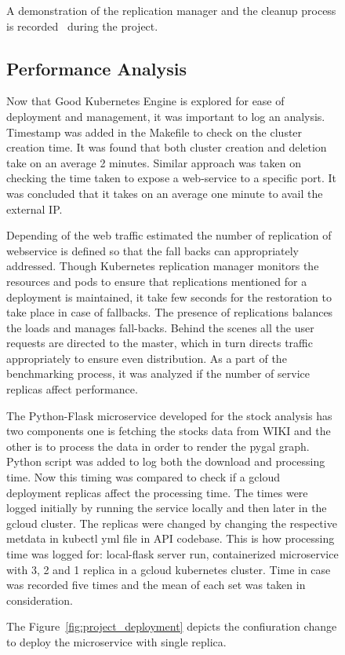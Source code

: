 \begin{figure}[htb]
A demonstration of the replication manager and the cleanup process is
  recorded~\cite{hid-sp18-417-google_cleanup} during the project.

\subsection{Performance Analysis}

Now that Good Kubernetes Engine is explored for ease of deployment and
management, it was important to log an analysis. Timestamp was added in the
Makefile to check on the cluster creation time. It was found that both cluster
creation and deletion take on an average 2 minutes. Similar approach was taken
on checking the time taken to expose a web-service to a specific port. It was
concluded that it takes on an average one minute to avail the external IP. 

Depending of the web traffic estimated the number of replication of webservice
is defined so that the fall backs can appropriately addressed. Though
Kubernetes replication manager monitors the resources and pods to ensure that
replications mentioned for a deployment is maintained, it take few seconds for
the restoration to take place in case of fallbacks. The presence of
replications balances the loads and manages fall-backs. Behind the scenes all
the user requests are directed to the master, which in turn directs traffic
appropriately to ensure even distribution. As a part of the benchmarking
process, it was analyzed if the number of service replicas affect performance.


The Python-Flask microservice developed for the stock analysis has two
components one is fetching the stocks data from WIKI and the other is to
process the data in order to render the pygal graph. Python script was added
to log both the download and processing time. Now this timing was compared to
check if a gcloud deployment replicas affect the processing time. The times
were logged initially by running the service locally and then later in the
gcloud cluster. The replicas were changed by changing the respective metdata
in kubectl yml file in API codebase. This is how processing time was logged
for: local-flask server run, containerized microservice with 3, 2 and 1
replica in a gcloud kubernetes cluster. Time in case was recorded five times
and the mean of each set was taken in consideration.


The Figure~\ref{fig:project_deployment} depicts the confiuration change to
deploy the microservice with single replica.


\end{figure}
